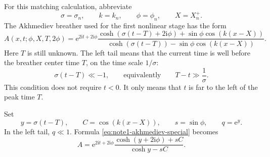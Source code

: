 \documentclass{amsart}
\newcounter{note}
\numberwithin{equation}{hw}
\begin{document}
For this matching calculation, abbreviate
\[
\sigma=\sigma_n,\qquad
k=k_n,\qquad
\phi=\phi_n,\qquad
X=X_n^+.
\]
The Akhmediev breather used for the first nonlinear stage has the form
\begin{equation}
A(x,t;\phi,X,T,2\phi)
=
\mathrm{e}^{2\mathrm{i}t+2\mathrm{i}\phi}
\frac{
\cosh\!\left(\sigma(t-T)+2\mathrm{i}\phi\right)
+
\sin\phi\cos\!\left(k(x-X)\right)
}{
\cosh\!\left(\sigma(t-T)\right)
-
\sin\phi\cos\!\left(k(x-X)\right)
}.
\label{eq:note1-akhmediev-special}
\end{equation}
Here \(T\) is still unknown.  The left tail means that the current time is
well before the breather center time \(T\), on the time scale
\(1/\sigma\):
\begin{equation}
\sigma(t-T)\ll -1,
\qquad\text{equivalently}\qquad
T-t\gg \frac{1}{\sigma}.
\label{eq:note1-left-tail-condition}
\end{equation}
This condition does not require \(t<0\).  It only means that \(t\) is far
to the left of the peak time \(T\).

Set
\begin{equation}
y=\sigma(t-T),
\qquad
C=\cos\!\left(k(x-X)\right),
\qquad
s=\sin\phi,
\qquad
q=\mathrm{e}^y.
\label{eq:note1-tail-variables}
\end{equation}
In the left tail, \(q\ll1\).  Formula \eqref{eq:note1-akhmediev-special}
becomes
\begin{equation}
A
=
\mathrm{e}^{2\mathrm{i}t+2\mathrm{i}\phi}
\frac{\cosh(y+2\mathrm{i}\phi)+sC}{\cosh y-sC}.
\label{eq:note1-akhmediev-y-form}
\end{equation}
\end{document}
